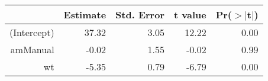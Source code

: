 \begin{tabular}{rrrrr}
  \hline
 & Estimate & Std. Error & t value & Pr($>$$|$t$|$) \\ 
  \hline
(Intercept) & 37.32 & 3.05 & 12.22 & 0.00 \\ 
  amManual & -0.02 & 1.55 & -0.02 & 0.99 \\ 
  wt & -5.35 & 0.79 & -6.79 & 0.00 \\ 
   \hline
\end{tabular}
